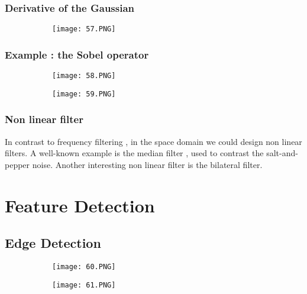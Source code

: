 \documentclass{article}
\begin{document}
\subsubsection{Derivative of the Gaussian}

\begin{figure}[ht!]
  \centering
  \begin{subfigure}[b]{0.7\linewidth}
    \texttt{[image: 57.PNG]}
  \end{subfigure}
\end{figure}


\subsubsection{Example : the Sobel operator}

\begin{figure}[ht!]
  \centering
  \begin{subfigure}[b]{0.6\linewidth}
    \texttt{[image: 58.PNG]}
  \end{subfigure}
     \begin{subfigure}[b]{0.39\textwidth}
         \centering
         \texttt{[image: 59.PNG]}
     \end{subfigure}
\end{figure}


\subsubsection{Non linear filter}
In contrast to frequency filtering , in the space domain we could design non linear filters.
A well-known example is the median filter , used to contrast the salt-and-pepper noise.
Another interesting non linear filter is the bilateral filter.


\vspace{40mm}

\section{Feature Detection}

\subsection{Edge Detection}

\begin{figure}[ht!]
  \centering
  \begin{subfigure}[b]{0.5\linewidth}
    \texttt{[image: 60.PNG]}
  \end{subfigure}
     \begin{subfigure}[b]{0.3\textwidth}
         \centering
         \texttt{[image: 61.PNG]}
     \end{subfigure}
\end{figure}
\end{document}
